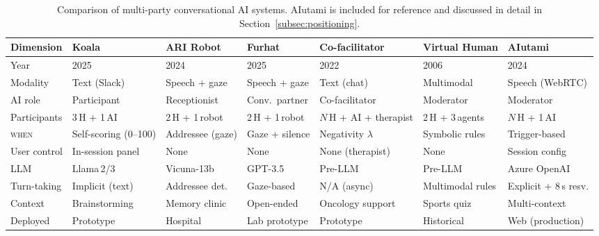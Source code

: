 \begin{table}[ht]
  \centering
  \caption{Comparison of multi-party conversational AI systems.  AIutami is
    included for reference and discussed in detail in
    Section~\ref{subsec:positioning}.}
  \label{tab:multiparty-comparison}
  \footnotesize
  \setlength{\tabcolsep}{3.5pt}
  \begin{tabularx}{\textwidth}{@{} l X X X X X X @{}}
    \toprule
    \textbf{Dimension}
      & \textbf{Koala}
      & \textbf{ARI Robot}
      & \textbf{Furhat}
      & \textbf{Co-facilitator}
      & \textbf{Virtual Human}
      & \textbf{AIutami} \\
    \midrule
    Year
      & 2025 & 2024 & 2025 & 2022 & 2006 & 2024 \\
    Modality
      & Text (Slack)
      & Speech + gaze
      & Speech + gaze
      & Text (chat)
      & Multimodal
      & Speech (WebRTC) \\
    AI role
      & Participant
      & Receptionist
      & Conv.\ partner
      & Co-facilitator
      & Moderator
      & Moderator \\
    Participants
      & 3\,H + 1\,AI
      & 2\,H + 1\,robot
      & 2\,H + 1\,robot
      & $N$\,H + AI + therapist
      & 2\,H + 3\,agents
      & $N$\,H + 1\,AI \\
    \textsc{when}
      & Self-scoring (0--100)
      & Addressee (gaze)
      & Gaze + silence
      & Negativity $\lambda$
      & Symbolic rules
      & Trigger-based \\
    User control
      & In-session panel
      & None
      & None
      & None (therapist)
      & None
      & Session config \\
    LLM
      & Llama\,2/3
      & Vicuna-13b
      & GPT-3.5
      & Pre-LLM
      & Pre-LLM
      & Azure OpenAI \\
    Turn-taking
      & Implicit (text)
      & Addressee det.
      & Gaze-based
      & N/A (async)
      & Multimodal rules
      & Explicit + 8\,s resv. \\
    Context
      & Brainstorming
      & Memory clinic
      & Open-ended
      & Oncology support
      & Sports quiz
      & Multi-context \\
    Deployed
      & Prototype
      & Hospital
      & Lab prototype
      & Prototype
      & Historical
      & Web (production) \\
    \bottomrule
  \end{tabularx}
\end{table}

